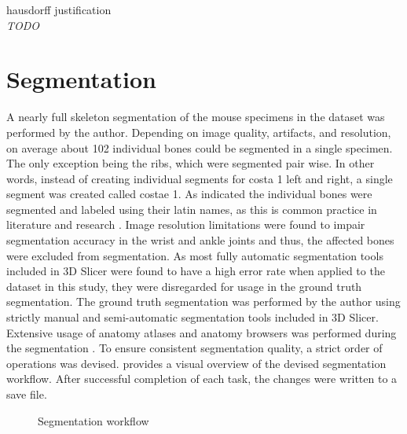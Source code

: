hausdorff \cite{aspertMESHMeasuringErrors2002}
justification \cite{wangImageSegmentationEvaluation2020}\\
\textit{TODO}

\section{Segmentation}\label{s:segmentation}
A nearly full skeleton segmentation of the mouse specimens in the dataset was performed by the author.
Depending on image quality, artifacts, and resolution, on average about 102 individual bones could be segmented in a single specimen.
The only exception being the ribs, which were segmented pair wise.
In other words, instead of creating individual segments for costa 1 left and right, a single segment was created called costae 1.
As indicated the individual bones were segmented and labeled using their latin names, as this is common practice in literature and research \cite{harrisonVertebralLandmarksIdentification2013,jeromeSkeletalSystem2018,ruberteMorphologicalMousePhenotyping2017,ruberteBridgingMouseHuman2023}.
Image resolution limitations were found to impair segmentation accuracy in the wrist and ankle joints and thus, the affected bones were excluded from segmentation.
As most fully automatic segmentation tools included in 3D Slicer were found to have a high error rate when applied to the dataset in this study, they were disregarded for usage in the ground truth segmentation.
The ground truth segmentation was performed by the author using strictly manual and semi-automatic segmentation tools included in 3D Slicer.
Extensive usage of anatomy atlases and anatomy browsers was performed during the segmentation \cite{jeromeSkeletalSystem2018,harrisonVertebralLandmarksIdentification2013,platzerTaschenatlasAnatomieBd2013,ruberteMorphologicalMousePhenotyping2017,ruberteBridgingMouseHuman2023,rautenkranzSectionalanatomy2018}.
To ensure consistent segmentation quality, a strict order of operations was devised.
 provides a visual overview of the devised segmentation workflow.
After successful completion of each task, the changes were written to a save file.
\begin{figure}[ht]
	\begin{center}
		
	\end{center}
	\caption{Segmentation workflow}\label{fig:segmentation-workflow}
\end{figure}

